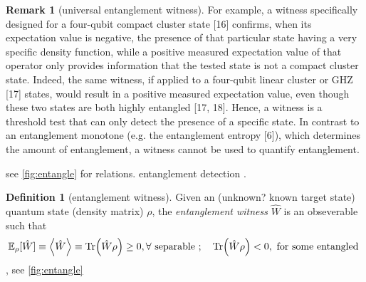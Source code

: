 \documentclass[
10pt,
aps,
pra,
linenumbers,
floatfix,
]{revtex4-2}
\theoremstyle{plain}
\theoremstyle{definition}
\newtheorem{definition}{Definition}
\newtheorem{remark}{Remark}
\newcommand{\ew}{\hat{W}}
\newcommand{\dm}{\rho}
\begin{document}
\begin{remark}[universal entanglement witness]
	\cite{sciaraUniversalPartiteLevel2019}
	For example, a witness specifically designed for a four-qubit compact cluster state [16] conﬁrms, when its expectation value is negative, the presence of that particular state having a very speciﬁc density function, while a positive measured expectation value of that operator only provides information that the tested state is not a compact cluster state. 
	Indeed, the same witness, if applied to a four-qubit linear cluster or GHZ [17] states, would result in a positive measured expectation value, even though these two states are both highly entangled [17, 18]. 
	Hence, a witness is a threshold test that can only detect the presence of a speciﬁc state. 
	In contrast to an entanglement monotone (e.g. the entanglement entropy [6]), which determines the amount of entanglement, a witness cannot be used to quantify entanglement.	
\end{remark}


see \cref{fig:entangle} for relations.
entanglement detection \cite{guhneEntanglementDetection2009}.
\begin{definition}[entanglement witness]\label{def:entanglement_witness}
	Given an (unknown? known target state) quantum state (density matrix) $\dm$, the \emph{entanglement witness} $\ew$ is an obseverable such that
	\begin{equation}
		\expectation_{\dm}[\ew]\equiv\expval{\ew}\equiv
		\Tr(\ew\dm) \ge 0 , \forall \text{ separable };\quad
		\Tr(\ew\dm) < 0 , \text{ for some entangled }
	\end{equation}
	\cite{terhalBellInequalitiesSeparability2000}, see \cref{fig:entangle}
\end{definition}
\end{document}
